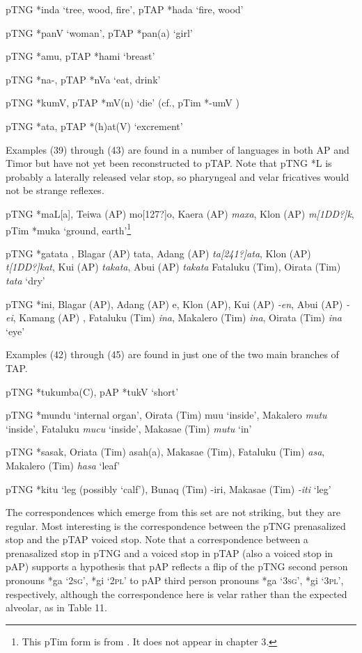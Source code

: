 \ea%
   pTNG *inda `tree, wood, fire', pTAP *hada `fire, wood'
\z

\ea%
   pTNG *panV `woman', pTAP *pan(a) `girl'
\z

\ea%
   pTNG *amu, pTAP *hami `breast'
\z

\ea%
   pTNG *na-, pTAP *nVa `eat, drink'
\z

\ea%
   pTNG *kumV, pTAP *mV(n) `die' (cf., pTim *-umV )
\z

\ea%
   pTNG *ata, pTAP *(h)at(V) `excrement'
\z

Examples (39) through (43) are found in a number of languages in both AP and Timor but have not yet been reconstructed to pTAP. Note that pTNG *L is probably a laterally released velar stop, so pharyngeal and velar fricatives would not be strange reflexes.

\ea%
   pTNG *maL[a], Teiwa (AP) mo[127?]o{\textglotstop}, Kaera (AP) \textit{maxa}, Klon (AP) \textit{m[1DD?]k{\textepsilon}{\textglotstop}}, pTim *muka `ground, earth'\footnote{This pTim form is from \citet{SchapperEtAl2012}. It does not appear in chapter 3. }


\z

\ea%
   pTNG *gatata , Blagar (AP) tata, Adang (AP) \textit{ta}\textit{[241?]}\textit{ata}, Klon (AP) \textit{t}\textit{[1DD?]}\textit{kat}, Kui (AP) \textit{takata}, Abui (AP) \textit{takata} Fataluku (Tim), Oirata (Tim) \textit{tata} `dry'


\z

\ea%
pTNG *ini, Blagar (AP), Adang (AP) e{\ng}, Klon (AP), Kui (AP) \textit{-en}, Abui (AP) \textit{-ei{\ng}}, Kamang (AP) \textit{{\ng}}, Fataluku (Tim) \textit{ina}, Makalero (Tim) \textit{ina}, Oirata (Tim) \textit{ina} `eye'
   \z

Examples (42) through (45) are found in just one of the two main branches of TAP.

\ea%
   pTNG *tukumba(C), pAP *tukV `short'
\z

\ea%
   pTNG *mundu `internal organ', Oirata (Tim) mu{\textrtailt}u `inside', Makalero \textit{mutu} `inside', Fataluku \textit{mucu }`inside', Makasae (Tim) \textit{mutu }`in'
\z

\ea%
   pTNG *sasak, Oriata (Tim) asah(a), Makasae (Tim), Fataluku (Tim) \textit{asa}, Makalero (Tim) \textit{hasa }`leaf'
\z

\ea%
   pTNG *kitu `leg (possibly `calf'), Bunaq (Tim) -iri, Makasae (Tim) \textit{-iti} `leg'
\z

The correspondences which emerge from this set are not striking, but they are regular. Most interesting is the correspondence between the pTNG prenasalized stop and the pTAP voiced stop. Note that a correspondence between a prenasalized stop in pTNG and a voiced stop in pTAP (also a voiced stop in pAP) supports a hypothesis that pAP reflects a flip of the pTNG second person pronouns *{\ng}ga `\textsc{2sg}', *{\ng}gi `\textsc{2pl}' to pAP third person pronouns *ga `\textsc{3sg}', *gi `\textsc{3pl}', respectively, although the correspondence here is velar rather than the expected alveolar, as in Table 11.


